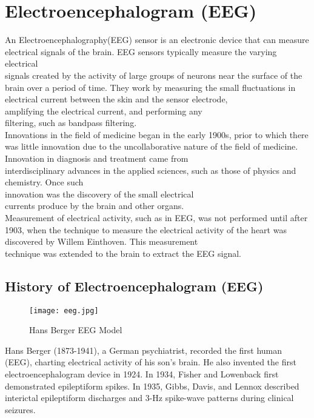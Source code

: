 \documentclass[12pt,a4paper]{article}
\begin{document}
\section{Electroencephalogram (EEG)}
{\large An Electroencephalography(EEG) sensor is an electronic device that can measure electrical signals of the brain. EEG sensors typically measure the varying electrical\\ signals created by the activity of large groups of neurons near the surface of the brain over a period of time. They work by measuring the small fluctuations in electrical current between the skin and the sensor electrode,\\ amplifying the electrical current, and performing any\\ filtering, such as bandpass filtering.\\ Innovations in the field of medicine began in the early 1900s, prior to which there was little innovation due to the uncollaborative nature of the field of medicine. Innovation in diagnosis and treatment came from\\interdisciplinary advances in the applied sciences, such as those of physics and chemistry. Once such\\ innovation was the discovery of the small electrical\\ currents produce by the brain and other organs.\\ Measurement of electrical activity, such as in EEG, was not performed until after 1903, when the technique to measure the electrical activity of the heart was\\ discovered by Willem Einthoven. This measurement\\ technique was extended to the brain to extract the EEG signal.}



\subsection{History of Electroencephalogram (EEG)}




\begin{figure}[h]
\centering
\texttt{[image: eeg.jpg]}
\caption{Hans Berger EEG Model}
\end{figure}




{\large Hans Berger (1873-1941), a German psychiatrist, recorded the first human (EEG), charting electrical activity of his son's brain. He also invented the first electroencephalogram device in 1924. In 1934, Fisher and Lowenback first demonstrated epileptiform spikes. In 1935, Gibbs, Davis, and Lennox described interictal epileptiform discharges and 3-Hz spike-wave patterns during clinical seizures.}
\end{document}

